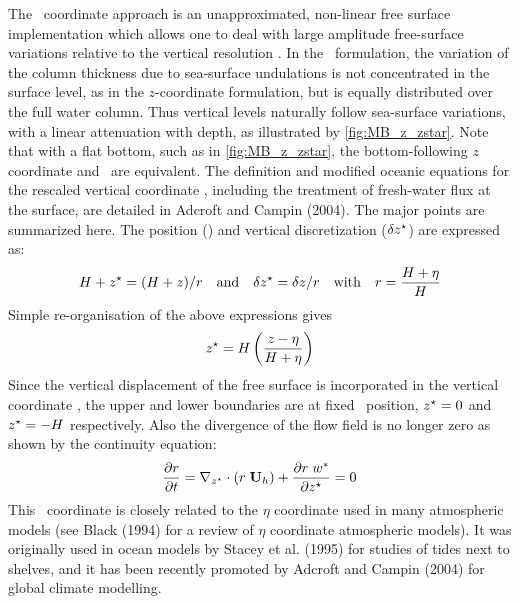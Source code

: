 \documentclass[../main/NEMO_manual]{subfiles}
\begin{document}
The \zstar\ coordinate approach is an unapproximated, non-linear free surface implementation which
allows one to deal with large amplitude free-surface variations relative to the vertical resolution
\citep{adcroft.campin_OM04}.
In the \zstar\ formulation, the variation of the column thickness due to sea-surface undulations is
not concentrated in the surface level, as in the $z$-coordinate formulation,
but is equally distributed over the full water column.
Thus vertical levels naturally follow sea-surface variations, with a linear attenuation with depth,
as illustrated by \autoref{fig:MB_z_zstar}.
Note that with a flat bottom, such as in \autoref{fig:MB_z_zstar},
the bottom-following $z$ coordinate and \zstar\ are equivalent.
The definition and modified oceanic equations for the rescaled vertical coordinate \zstar,
including the treatment of fresh-water flux at the surface, are detailed in Adcroft and Campin (2004).
The major points are summarized here.
The position (\zstar) and vertical discretization ($\delta \zstar$) are expressed as:
\[
  H + \zstar = (H + z)  / r \quad \text{and}  \quad \delta \zstar = \delta z / r \quad \text{with} \quad r = \frac{H + \eta}{H}
\]
Simple re-organisation of the above expressions gives
\[
  \zstar = H \lt( \frac{z - \eta}{H + \eta} \rt)
\]
Since the vertical displacement of the free surface is incorporated in the vertical coordinate \zstar,
the upper and lower boundaries are at fixed \zstar\ position,
$\zstar = 0$ and $\zstar = -H$ respectively.
Also the divergence of the flow field is no longer zero as shown by the continuity equation:
\[
  \pd[r]{t} = \nabla_{\zstar} \cdot \lt( r \; \vect U_h \rt) + \pd[r \; w^*]{\zstar} = 0
\]
This \zstar\ coordinate is closely related to the $\eta$ coordinate used in many atmospheric models
(see Black (1994) for a review of $\eta$ coordinate atmospheric models).
It was originally used in ocean models by Stacey et al. (1995) for studies of tides next to shelves,
and it has been recently promoted by Adcroft and Campin (2004) for global climate modelling.
\end{document}
